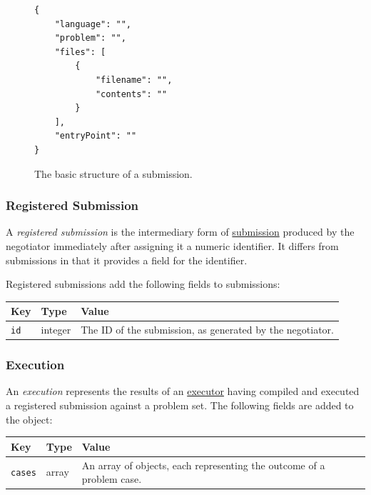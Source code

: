 \documentclass[11pt,letterpaper]{article}
\begin{document}
\begin{figure}
\begin{lstlisting}
{
    "language": "",
    "problem": "",
    "files": [
        {
            "filename": "",
            "contents": ""
        }
    ],
    "entryPoint": ""
}
\end{lstlisting}
\caption{The basic structure of a submission.}
\label{comm-formats-sub-listing}
\end{figure}

\subsubsection{Registered Submission}
\label{comm-formats-reg-sub}

A \emph{registered submission} is the intermediary form of
\hyperref[comm-formats-sub]{submission} produced by the negotiator immediately
after assigning it a numeric identifier. It differs from submissions in that it
provides a field for the identifier.

Registered submissions add the following fields to submissions:

\nopagebreak
\begin{tabulary}{\textwidth}{ | l | l | L | }
    \hline
    \textbf{Key} & \textbf{Type} & \textbf{Value} \\
    \hline
    \texttt{id} & integer & The ID of the submission, as generated by the
        negotiator. \\
    \hline
\end{tabulary}

\subsubsection{Execution}
\label{comm-formats-exec}

An \emph{execution} represents the results of an
\hyperref[design-executor-judge]{executor} having compiled and executed a
registered submission against a problem set. The following fields are added to
the object:

\nopagebreak
\begin{tabulary}{\textwidth}{ | l | l | L | }
    \hline
    \textbf{Key} & \textbf{Type} & \textbf{Value} \\
    \hline
    \texttt{cases} & array & An array of objects, each representing the outcome
        of a problem case. \\
    \hline
\end{tabulary}
\end{document}
